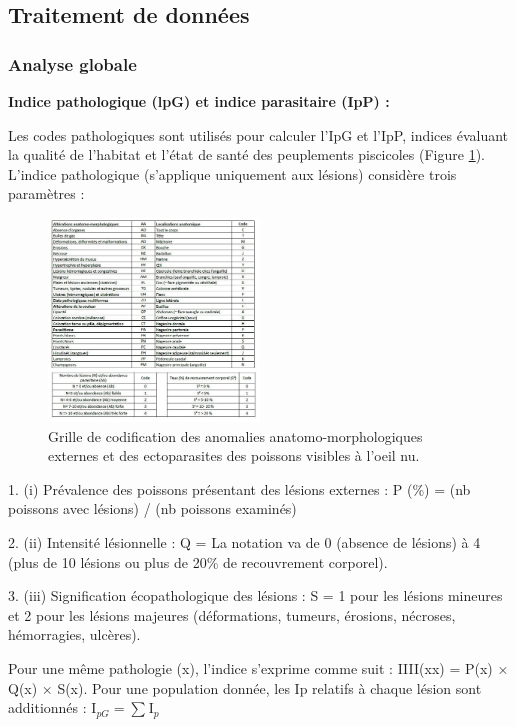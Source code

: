 \documentclass[11pt,titlepage,twoside]{article}\usepackage[]{graphicx}\usepackage[table]{xcolor}
\begin{document}
\subsection{Traitement de données }

\subsubsection{Analyse globale }

\textbf{Indice pathologique (lpG) et indice parasitaire (IpP) :} 


Les codes pathologiques sont utilisés pour calculer l’IpG et l’IpP, indices évaluant la qualité de l’habitat et l’état de santé des peuplements piscicoles \citep{elie_sante_2014} (Figure \ref{Grille}). L’indice pathologique (s’applique uniquement aux lésions) considère trois paramètres : 

\begin{figure}[htpb]
\centering
\includegraphics[width=0.5\textwidth]{Grille}
\caption{Grille de codification des anomalies anatomo-morphologiques externes et des ectoparasites des poissons visibles à l'oeil nu. \citep{elie_sante_2014}}
\label{Grille}
\end{figure}

1.	(i)  Prévalence des poissons présentant des lésions externes : P (\%) = (nb poissons avec lésions) / (nb poissons examinés) 

2.	(ii)  Intensité lésionnelle : Q = La notation va de 0 (absence de lésions) à 4 (plus de 10 lésions ou plus de 20\% de recouvrement corporel). 

3.	(iii) Signification écopathologique des lésions : S = 1 pour les lésions mineures et 2 pour les lésions majeures (déformations, tumeurs, érosions, nécroses, hémorragies, ulcères). 

Pour une même pathologie (x), l’indice s’exprime comme suit : IIII(xx) = P(x) × Q(x) × S(x). Pour une population donnée, les Ip relatifs à chaque lésion sont additionnés : $ \mathrm{I}_{pG}^{} = \sum_{}^{}\mathrm{I}_{p}^{} $
\end{document}

